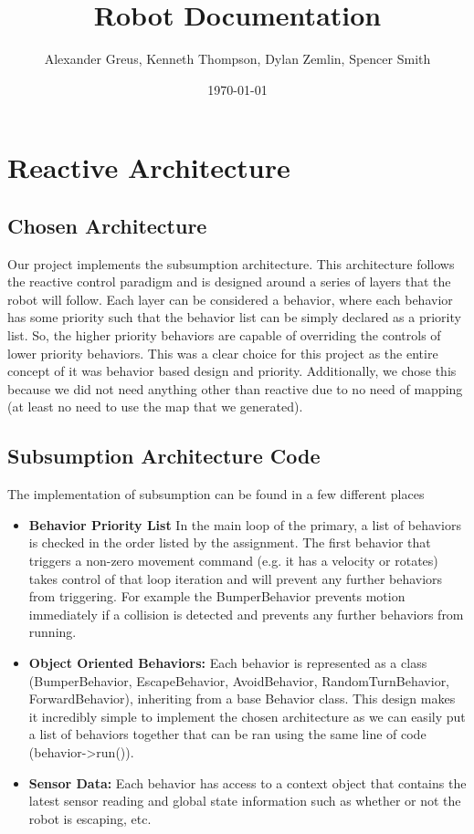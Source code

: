 \documentclass[12pt]{article}
\title{Robot Documentation}
\author{Alexander Greus, Kenneth Thompson, Dylan Zemlin, Spencer Smith}
\date{\today}
\begin{document}
\maketitle

\section{Reactive Architecture}

\subsection{Chosen Architecture}
Our project implements the subsumption architecture. This architecture follows the reactive control paradigm and is designed around a series of layers that the robot will follow. Each layer can be considered a behavior, where each behavior has some priority such that the behavior list can be simply declared as a priority list. So, the higher priority behaviors are capable of overriding the controls of lower priority behaviors. This was a clear choice for this project as the entire concept of it was behavior based design and priority. Additionally, we chose this because we did not need anything other than reactive due to no need of mapping (at least no need to use the map that we generated).

\subsection{Subsumption Architecture Code}
The implementation of subsumption can be found in a few different places
\begin{itemize}
    \item \textbf{Behavior Priority List} In the main loop of the primary, a list of behaviors is checked in the order listed by the assignment. The first behavior that triggers a non-zero movement command (e.g. it has a velocity or rotates) takes control of that loop iteration and will prevent any further behaviors from triggering. For example the BumperBehavior prevents motion immediately if a collision is detected and prevents any further behaviors from running.
    \item \textbf{Object Oriented Behaviors:} Each behavior is represented as a class (BumperBehavior, EscapeBehavior, AvoidBehavior, RandomTurnBehavior, ForwardBehavior), inheriting from a base Behavior class. This design makes it incredibly simple to implement the chosen architecture as we can easily put a list of behaviors together that can be ran using the same line of code (behavior->run()).
    \item \textbf{Sensor Data:} Each behavior has access to a context object that contains the latest sensor reading and global state information such as whether or not the robot is escaping, etc.
\end{itemize}
\end{document}

